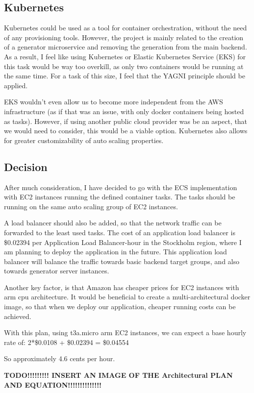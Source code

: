 	\subsection{Kubernetes}
		Kubernetes could be used as a tool for container orchestration, without the need of any provisioning tools. 
		However, the project is mainly related to the creation of a generator
		microservice and removing the generation from the main backend. As a result, I feel like using 
		Kubernetes or Elastic Kubernetes Service (EKS) for this task
		would be way too overkill, as only two containers would be running at the same time. 
		For a task of this size, I feel that the YAGNI principle should be applied.
		
		EKS wouldn't even allow us to become more independent
		from the AWS infrastructure (as if that was an issue, with only docker containers being hosted as tasks). However, if using another 
		public cloud provider was be an aspect, that we would need to consider, this would be a viable option. Kubernetes also allows for 
		greater customizability of auto scaling properties.

	\subsection{Decision} \label{awsdecision}
		After much consideration, I have decided to go with the ECS implementation with EC2 instances running the defined container tasks.
		The tasks should be running on the same auto scaling group of EC2 instances. 
		
		A load balancer should also be added, so that the 
		network traffic can be forwarded to the least used tasks. The cost of an application load balancer is \$0.02394 per Application 
		Load Balancer-hour in the Stockholm region, where I am planning to deploy the application in the future. This application load balancer
		will balance the traffic towards basic backend target groups, and also towards generator server instances.

		Another key factor, is that Amazon has cheaper prices for EC2 instances with arm cpu architecture. It would be beneficial
		to create a multi-architectural docker image, so that when we deploy our application, cheaper running costs can be 
		achieved.

		With this plan, using t3a.micro arm EC2 instances, we can expect a base hourly rate of: 2*\$0.0108 + \$0.02394 = \$0.04554

		So approximately 4.6 cents per hour.

		\textbf{TODO!!!!!!!!! INSERT AN IMAGE OF THE Architectural PLAN AND EQUATION!!!!!!!!!!!!!!}